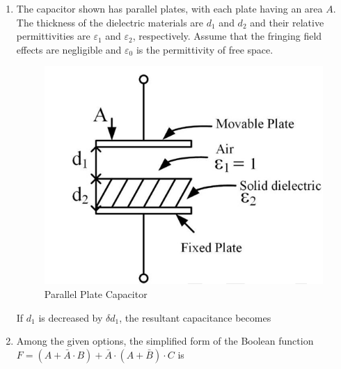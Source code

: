 \documentclass[journal,12pt,onecolumn]{IEEEtran}
\theoremstyle{remark}
\begin{document}
\begin{enumerate}
\item The capacitor shown  has parallel plates, with each plate having an area $A$. The thickness of the dielectric materials are $d_1$ and $d_2$ and their relative permittivities are $\varepsilon_1$ and $\varepsilon_2$, respectively. Assume that the fringing field effects are negligible and $\varepsilon_0$ is the permittivity of free space.
\begin{figure}[H]
    \centering
    \includegraphics[width=0.5\columnwidth]{Figs/Q-15.png}
    \caption{Parallel Plate Capacitor}
    \label{15}
\end{figure}
If $d_1$ is decreased by $\delta d_1$, the resultant capacitance becomes
\par\hfill{}
    \begin{enumerate}
    \end{enumerate}

\item Among the given options, the simplified form of the Boolean function $F = (A+ \bar{A}\cdot B) + \bar{A}\cdot(A+ \bar{B})\cdot C$ is
\par\hfill{}
    \begin{enumerate}
    \end{enumerate}


\end{enumerate}
\end{document}
